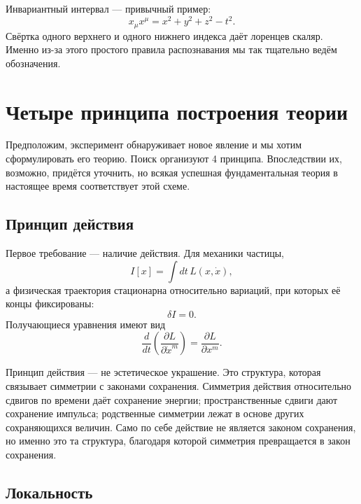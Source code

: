 Инвариантный интервал — привычный пример:
\begin{equation}
x_\mu x^\mu
=
x^2+y^2+z^2-t^2.
\label{eq:sr7-interval}
\end{equation}
Свёртка одного верхнего и одного нижнего индекса даёт лоренцев скаляр. Именно из-за этого простого правила распознавания мы так тщательно ведём обозначения.

\section{Четыре принципа построения теории}

Предположим, эксперимент обнаруживает новое явление и мы хотим сформулировать его теорию. Поиск организуют 4 принципа. Впоследствии их, возможно, придётся уточнить, но всякая успешная фундаментальная теория в настоящее время соответствует этой схеме.

\subsection{Принцип действия}

Первое требование — наличие действия. Для механики частицы,
\begin{equation}
I[x]
=
\int dt\,L(x,\dot x),
\label{eq:sr7-particle-action-general}
\end{equation}
а физическая траектория стационарна относительно вариаций, при которых её концы фиксированы:
\begin{equation}
\delta I=0.
\end{equation}
Получающиеся уравнения имеют вид
\begin{equation}
\frac{d}{dt}
\left(
\frac{\partial L}{\partial\dot x^m}
\right)
=
\frac{\partial L}{\partial x^m}.
\label{eq:sr7-EL}
\end{equation}

Принцип действия — не эстетическое украшение. Это структура, которая связывает симметрии с законами сохранения. Симметрия действия относительно сдвигов по времени даёт сохранение энергии; пространственные сдвиги дают сохранение импульса; родственные симметрии лежат в основе других сохраняющихся величин. Само по себе действие не является законом сохранения, но именно это та структура, благодаря которой симметрия превращается в закон сохранения.

\subsection{Локальность}

